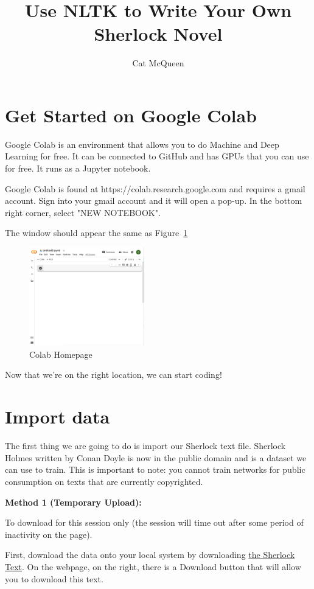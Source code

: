 \documentclass{article}
\title{Use NLTK to Write Your Own Sherlock Novel}
\author{Cat McQueen}
\begin{document}
\maketitle

\section{Get Started on Google Colab}
Google Colab is an environment that allows you to do Machine and Deep Learning for free. It can be connected to GitHub and has GPUs that you can use for free. It runs as a Jupyter notebook.

Google Colab is found at https://colab.research.google.com and requires a gmail account. Sign into your gmail account and it will open a pop-up. 
In the bottom right corner, select "NEW NOTEBOOK".

The window should appear the same as Figure~\ref{fig:home}

\begin{figure}[h!]
\centering
\includegraphics[width=50mm]{ColabHome.png}
\caption{Colab Homepage}
\label{fig:home}
\end{figure}

Now that we're on the right location, we can start coding!

\section{Import data}
The first thing we are going to do is import our Sherlock text file. Sherlock Holmes written by Conan Doyle is now in the public domain and is a dataset we can use to train. This is important to note: you cannot train networks for public consumption on texts that are currently copyrighted.

\textbf{Method 1 (Temporary Upload):} 

To download for this session only (the session will time out after some period of inactivity on the page).

First, download the data onto your local system by downloading 
\href{https://github.com/CatMcQueen/catmcqueen.github.io/blob/b67a282c9be6bfd1ed17796c2507b9108cffb6bc/sherlock.txt}{the Sherlock Text}. On the webpage, on the right, there is a Download button that will allow you to download this text.
\end{document}
